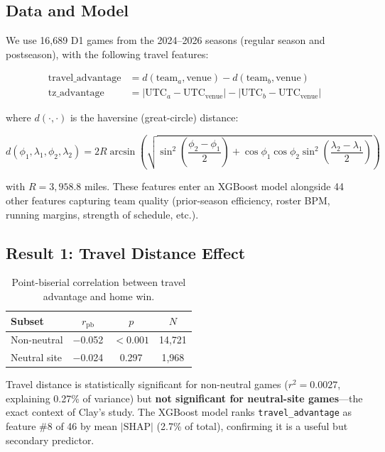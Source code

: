 \documentclass[11pt]{article}
\begin{document}
\subsection{Data and Model}

We use 16,689 D1 games from the 2024--2026 seasons (regular season and postseason), with the following travel features:

\begin{align}
\text{travel\_advantage} &= d(\text{team}_a, \text{venue}) - d(\text{team}_b, \text{venue}) \label{eq:travel} \\
\text{tz\_advantage} &= |\text{UTC}_a - \text{UTC}_{\text{venue}}| - |\text{UTC}_b - \text{UTC}_{\text{venue}}| \label{eq:tz}
\end{align}

\noindent where $d(\cdot,\cdot)$ is the haversine (great-circle) distance:

\begin{equation}
d(\phi_1, \lambda_1, \phi_2, \lambda_2) = 2R \arcsin\!\left(\sqrt{\sin^2\!\left(\frac{\phi_2 - \phi_1}{2}\right) + \cos\phi_1 \cos\phi_2 \sin^2\!\left(\frac{\lambda_2 - \lambda_1}{2}\right)}\right)
\label{eq:haversine}
\end{equation}

\noindent with $R = 3{,}958.8$ miles. These features enter an XGBoost model alongside 44 other features capturing team quality (prior-season efficiency, roster BPM, running margins, strength of schedule, etc.).

\subsection{Result 1: Travel Distance Effect}

\begin{table}[h]
\centering
\begin{tabular}{lccc}
\toprule
Subset & $r_{\text{pb}}$ & $p$ & $N$ \\
\midrule
Non-neutral & $-$0.052 & $< 0.001$ & 14{,}721 \\
Neutral site & $-$0.024 & 0.297 & 1{,}968 \\
\bottomrule
\end{tabular}
\caption{Point-biserial correlation between travel advantage and home win.}
\label{tab:travel_corr}
\end{table}

Travel distance is statistically significant for non-neutral games ($r^2 = 0.0027$, explaining 0.27\% of variance) but \textbf{not significant for neutral-site games}---the exact context of Clay's study. The XGBoost model ranks \texttt{travel\_advantage} as feature \#8 of 46 by mean $|\text{SHAP}|$ (2.7\% of total), confirming it is a useful but secondary predictor.
\end{document}

